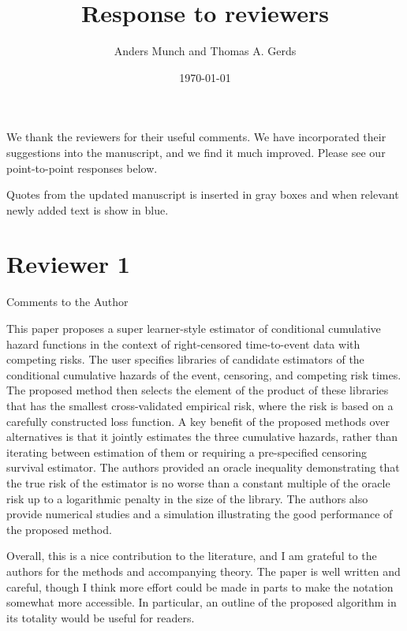 \documentclass[a4paper,danish]{article}
\author{Anders Munch and Thomas A. Gerds}
\date{\today}
\title{Response to reviewers}
\newcommand{\1}{\mathds{1}}
\newcommand{\answer}[1]{{\vspace{1em}{\bf #1}\vspace{1em}}}
\begin{document}
\maketitle
We thank the reviewers for their useful comments. We have incorporated
their suggestions into the manuscript, and we find it much
improved. Please see our point-to-point responses below.

Quotes from the updated manuscript is inserted in
{\color{gray} gray} boxes and when relevant newly added text
is show in {\color{blue} blue}.


\section*{Reviewer 1}
\label{sec:org84d32e2}

Comments to the Author

This paper proposes a super learner-style estimator of conditional
cumulative hazard functions in the context of right-censored
time-to-event data with competing risks. The user specifies libraries
of candidate estimators of the conditional cumulative hazards of the
event, censoring, and competing risk times. The proposed method then
selects the element of the product of these libraries that has the
smallest cross-validated empirical risk, where the risk is based on a
carefully constructed loss function. A key benefit of the proposed
methods over alternatives is that it jointly estimates the three
cumulative hazards, rather than iterating between estimation of them
or requiring a pre-specified censoring survival estimator. The authors
provided an oracle inequality demonstrating that the true risk of the
estimator is no worse than a constant multiple of the oracle risk up
to a logarithmic penalty in the size of the library. The authors also
provide numerical studies and a simulation illustrating the good
performance of the proposed method.

Overall, this is a nice contribution to the literature, and I am
grateful to the authors for the methods and accompanying theory. The
paper is well written and careful, though I think more effort could
be made in parts to make the notation somewhat more accessible. In
particular, an outline of the proposed algorithm in its totality
would be useful for readers.

 \answer{Thank you for the encouraging words. We agree that it is a good
idea with an outline of the proposed algorithm and we have added a
pseudo-algorithm at the end of section 4.}
\end{document}
